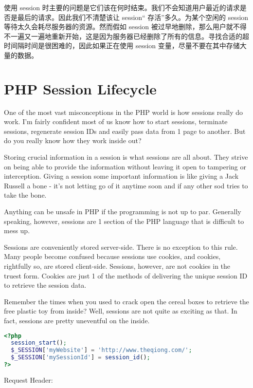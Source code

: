 使用 session 时主要的问题是它们该在何时结束。我们不会知道用户最近的请求是否是最后的请求。因此我们不清楚该让 session“ 存活”多久。为某个空闲的 session 等待太久会耗尽服务器的资源。然而假如 session 被过早地删除，那么用户就不得不一遍又一遍地重新开始，这是因为服务器已经删除了所有的信息。寻找合适的超时间隔时间是很困难的，因此如果正在使用 session 变量，尽量不要在其中存储大量的数据。


\section{PHP Session Lifecycle}


One of the most vast misconceptions in the PHP world is how sessions really do work\cite{php_session_lifecycle}. I'm fairly confident most of us know how to start sessions, terminate sessions, regenerate session IDs and easily pass data from 1 page to another. But do you really know how they work inside out?

Storing crucial information in a session is what sessions are all about. They strive on being able to provide the information without leaving it open to tampering or interception. Giving a session some important information is like giving a Jack Russell a bone - it's not letting go of it anytime soon and if any other sod tries to take the bone.

Anything can be unsafe in PHP if the programming is not up to par. Generally speaking, however, sessions are 1 section of the PHP language that is difficult to mess up.

Sessions are conveniently stored server-side. There is no exception to this rule. Many people become confused because sessions use cookies, and cookies, rightfully so, are stored client-side. Sessions, however, are not cookies in the truest form. Cookies are just 1 of the methods of delivering the unique session ID to retrieve the session data.

Remember the times when you used to crack open the cereal boxes to retrieve the free plastic toy from inside? Well, sessions are not quite as exciting as that. In fact, sessions are pretty uneventful on the inside.

\begin{lstlisting}[language=PHP]
<?php
  session_start();
  $_SESSION['myWebsite'] = 'http://www.theqiong.com/';
  $_SESSION['mySessionId'] = session_id();
?>
\end{lstlisting}

Request Header:

